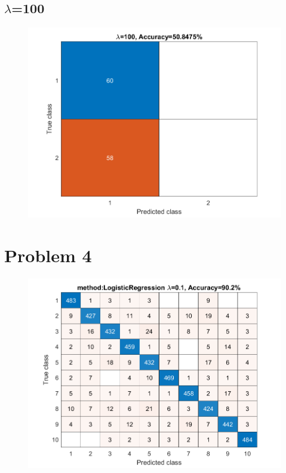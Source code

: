 \documentclass{article}
\begin{document}
\subsection*{{$\lambda$}=100}

\begin{figure}[H]
\includegraphics[scale = 0.75]{hwk4_problem3_lambda_100_plot.png}
\end{figure}

\newpage
\section*{Problem 4}

\begin{figure}[H]
\includegraphics[scale = 0.75]{hwk4_problem4_plot.png}
\end{figure}
\end{document}
